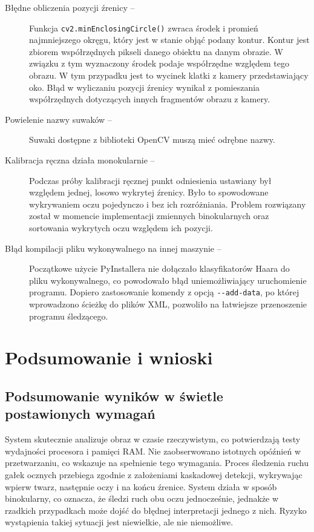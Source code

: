 \documentclass[a4paper,twoside,12pt]{book}
\begin{document}
\begin{description}
	\item[Błędne obliczenia pozycji źrenicy --]  Funkcja \texttt{cv2\-.minEnclosing\-Circle()} zwraca środek i promień najmniejszego okręgu, który jest w stanie objąć podany kontur. Kontur jest zbiorem współrzędnych pikseli danego obiektu na danym obrazie. W związku z tym wyznaczony środek podaje współrzędne względem tego obrazu. W tym przypadku jest to wycinek klatki z kamery przedstawiający oko. Błąd w wyliczaniu pozycji źrenicy wynikał z pomieszania współrzędnych dotyczących innych fragmentów obrazu z kamery.
	\item[Powielenie nazwy suwaków --] Suwaki dostępne z biblioteki OpenCV muszą mieć odrębne nazwy.
	\item[Kalibracja ręczna działa monokularnie --] Podczas próby kalibracji ręcznej punkt odniesienia ustawiany był względem jednej, losowo wykrytej źrenicy. Było to spowodowane wykrywaniem oczu pojedynczo i bez ich rozróżniania. Problem rozwiązany został w momencie implementacji zmiennych binokularnych oraz sortowania wykrytych oczu względem ich pozycji.
	\item[Błąd kompilacji pliku wykonywalnego na innej maszynie --] Początkowe użycie PyInstallera nie dołączało klasyfikatorów Haara do pliku wykonywalnego, co powodowało błąd uniemożliwiający uruchomienie programu. Dopiero zastosowanie komendy z opcją \texttt{-{}-add-data}, po której wprowadzono ścieżkę do plików XML, pozwoliło na łatwiejsze przenoszenie programu śledzącego.
\end{description}








%
%
%
\chapter{Podsumowanie i wnioski}

\section{Podsumowanie wyników w świetle postawionych wymagań}

System skutecznie analizuje obraz w czasie rzeczywistym, co potwierdzają testy wydajności procesora i pamięci RAM. Nie zaobserwowano istotnych opóźnień w przetwarzaniu, co wskazuje na spełnienie tego wymagania. Proces śledzenia ruchu gałek ocznych przebiega zgodnie z założeniami kaskadowej detekcji, wykrywając wpierw twarz, następnie oczy i na końcu źrenice. System działa w sposób binokularny, co oznacza, że śledzi ruch obu oczu jednocześnie, jednakże w rzadkich przypadkach może dojść do błędnej interpretacji jednego z nich. Ryzyko wystąpienia takiej sytuacji jest niewielkie, ale nie niemożliwe.
\end{document}
